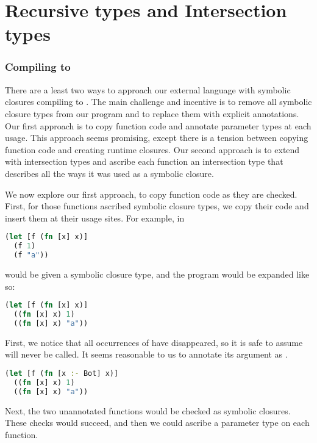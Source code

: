 \chapter{Recursive types and Intersection types}

\subsection{Compiling to \ltiFsub}

There are a least two ways to approach our external language
with symbolic closures compiling to \ltiFsub.
The main challenge and incentive is to remove all symbolic
closure types from our program and to replace them with
explicit annotations.
Our first approach is to copy function code and annotate
parameter types at each usage.
This approach seems promising, except there is a tension between
copying function code and creating runtime closures.
Our second approach is to extend \ltiFsub with intersection types
and ascribe each function an intersection type that 
describes all the ways it was used as a symbolic closure.

We now explore our first approach, to copy function code as they
are checked.
First, for those functions ascribed symbolic closure types, we
copy their code and insert them at their usage sites.
For example,  in 

\begin{lstlisting}[language=Clojure]
(let [f (fn [x] x)]
  (f 1)
  (f "a"))
\end{lstlisting}

would be given a symbolic closure type, and
the program would be expanded like so:

\begin{lstlisting}[language=Clojure]
(let [f (fn [x] x)]
  ((fn [x] x) 1)
  ((fn [x] x) "a"))
\end{lstlisting}

First, we notice that all occurrences of  have disappeared,
so it is safe to assume  will never be called. It seems
reasonable to us to annotate its argument as .

\begin{lstlisting}[language=Clojure]
(let [f (fn [x :- Bot] x)]
  ((fn [x] x) 1)
  ((fn [x] x) "a"))
\end{lstlisting}

Next, the two unannotated functions would be checked as symbolic closures.
These checks would succeed, and then we could ascribe a parameter type on
each function.

